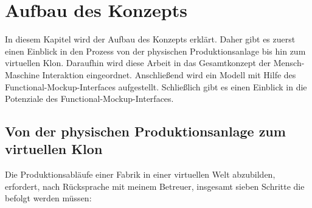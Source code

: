 \chapter{Aufbau des Konzepts}\label{cha:AufbauDesKonzepts}

In diesem Kapitel wird der Aufbau des Konzepts erklärt. Daher gibt es zuerst einen Einblick in den Prozess von der physischen Produktionsanlage bis hin zum virtuellen Klon. Daraufhin wird diese Arbeit in das Gesamtkonzept der Mensch-Maschine Interaktion eingeordnet. Anschließend wird ein Modell mit Hilfe des Functional-Mockup-Interfaces aufgestellt. Schließlich gibt es einen Einblick in die Potenziale des Functional-Mockup-Interfaces.

\section{Von der physischen Produktionsanlage zum virtuellen Klon}\label{sec:PhysischZumKlon}
Die Produktionsabläufe einer Fabrik in einer virtuellen Welt abzubilden, erfordert, nach Rücksprache mit meinem Betreuer, insgesamt sieben Schritte die befolgt werden müssen:

